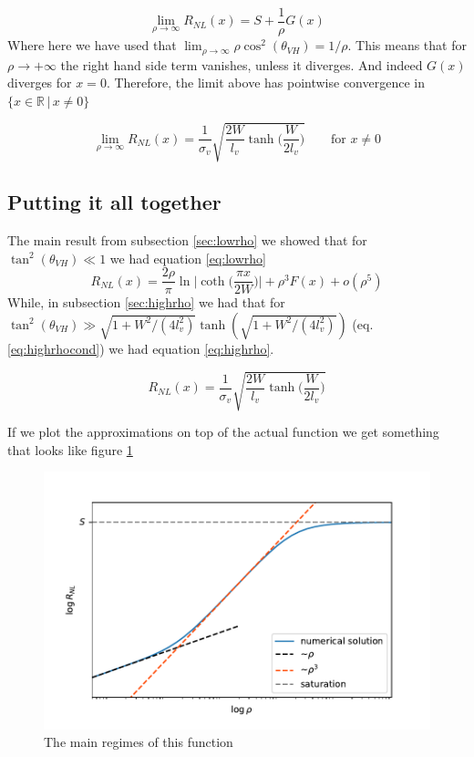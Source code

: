\begin{equation}
    \lim_{\rho\to\infty} R_{NL}(x)=S + \frac 1\rho G(x)
\end{equation}
Where here we have used that $\lim_{\rho\to \infty}\rho\cos^2(\theta_{VH})=1/\rho$.
This means that for $\rho\to +\infty$ the right hand side term vanishes, unless it diverges. And indeed $G(x)$ diverges for $x=0$. Therefore, the limit above has pointwise convergence in $\{x\in \mathbb R\,|\,x\neq 0\}$

\begin{equation}
    \lim_{\rho\to\infty} R_{NL}(x) = \frac 1{\sigma_v}\sqrt{\frac {2W}{l_v}\tanh\bigg(\frac W{2l_v} \bigg)}
    \quad\quad \textrm{for }x\neq 0
    \label{eq:highrho}
\end{equation}














\subsection{Putting it all together}
The main result from subsection \ref{sec:lowrho} we showed that for $\tan^2(\theta_{VH})\ll 1$ we had equation \ref{eq:lowrho}
\[
    R_{NL}(x)=
    \frac{2\rho}\pi\ln\bigg |\coth \Big(\frac{\pi x}{2W}\Big)\bigg | +
    \rho^3F(x) +
    o(\rho^5)
\]
While, in subsection \ref{sec:highrho} we had that for $\tan^2(\theta_{VH})\gg \sqrt{1+W^2/(4l_v^2)}\tanh\left(\sqrt{1+W^2/(4l_v^2)}\right)$ (eq. \ref{eq:highrhocond}) we had equation \ref{eq:highrho}.

\[
    R_{NL}(x) = \frac 1{\sigma_v}\sqrt{\frac {2W}{l_v}\tanh\bigg(\frac W{2l_v} \bigg)}
\]

If we plot the approximations on top of the actual function we get something that looks like figure \ref{fig:all_approx_rho}
\begin{figure}[h!]
    \centering
    \includegraphics[width=\linewidth]{Immagini/rnl/all_approx_rho.pdf}
    \caption{The main regimes of this function}
    \label{fig:all_approx_rho}
\end{figure}\\

